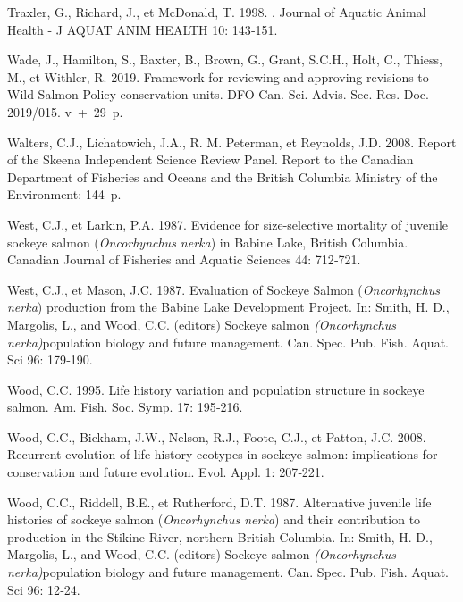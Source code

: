 \documentclass[french,11pt]{book}
\begin{document}
\begin{CSLReferences}{1}{0}
Traxler, G., Richard, J., et McDonald, T. 1998. . Journal of Aquatic Animal Health - J AQUAT ANIM HEALTH 10: 143‑151.

Wade, J., Hamilton, S., Baxter, B., Brown, G., Grant, S.C.H., Holt, C., Thiess, M., et Withler, R. 2019. Framework for reviewing and approving revisions to Wild Salmon Policy conservation units. DFO Can. Sci. Advis. Sec. Res. Doc. 2019/015. v~+~29~p.

Walters, C.J., Lichatowich, J.A., R. M. Peterman, et Reynolds, J.D. 2008. {Report of the Skeena Independent Science Review Panel.} Report to the Canadian Department of Fisheries and Oceans and the British Columbia Ministry of the Environment: 144~p.

West, C.J., et Larkin, P.A. 1987. {Evidence for size-selective mortality of juvenile sockeye salmon (}\emph{Oncorhynchus nerka}{) in Babine Lake, British Columbia}. Canadian Journal of Fisheries and Aquatic Sciences 44: 712‑721.

West, C.J., et Mason, J.C. 1987. {Evaluation of Sockeye Salmon (}\emph{Oncorhynchus nerka}{) production from the Babine Lake Development Project}. {In: Smith, H. D., Margolis, L., and Wood, C.C. (editors) Sockeye salmon }\emph{(Oncorhynchus nerka)}{population biology and future management. Can. Spec. Pub. Fish. Aquat. Sci} 96: 179‑190.

Wood, C.C. 1995. {Life history variation and population structure in sockeye salmon}. {Am. Fish. Soc. Symp.} 17: 195‑216.

Wood, C.C., Bickham, J.W., Nelson, R.J., Foote, C.J., et Patton, J.C. 2008. {Recurrent evolution of life history ecotypes in sockeye salmon: implications for conservation and future evolution}. {Evol. Appl.} 1: 207‑221.

Wood, C.C., Riddell, B.E., et Rutherford, D.T. 1987. {Alternative juvenile life histories of sockeye salmon (}\emph{Oncorhynchus nerka}{) and their contribution to production in the Stikine River, northern British Columbia}. {In: Smith, H. D., Margolis, L., and Wood, C.C. (editors) Sockeye salmon }\emph{(Oncorhynchus nerka)}{population biology and future management. Can. Spec. Pub. Fish. Aquat. Sci} 96: 12‑24.


\end{CSLReferences}
\end{document}
